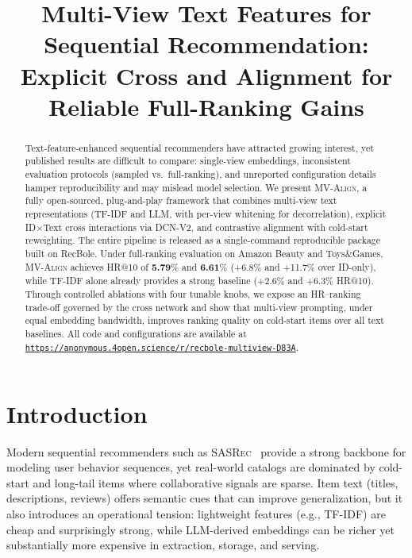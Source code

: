 \documentclass[sigconf,natbib=true,anonymous]{acmart}
\newcommand{\model}{\textsc{MV-Align}\xspace}
\newcommand{\base}{\textsc{SASRec}\xspace}
\newcommand{\tfidf}{\textsc{TF-IDF}\xspace}
\newcommand{\llm}{\textsc{LLM}\xspace}
\begin{document}
\title{Multi-View Text Features for Sequential Recommendation:\\
Explicit Cross and Alignment for Reliable Full-Ranking Gains}


\begin{abstract}
Text-feature-enhanced sequential recommenders have attracted growing interest, yet published results are difficult to compare: single-view embeddings, inconsistent evaluation protocols (sampled vs.\ full-ranking), and unreported configuration details hamper reproducibility and may mislead model selection.
%
We present \model, a fully open-sourced, plug-and-play framework that combines multi-view text representations (\tfidf and \llm, with per-view whitening for decorrelation), explicit ID$\times$Text cross interactions via DCN-V2, and contrastive alignment with cold-start reweighting.
The entire pipeline is released as a single-command reproducible package built on RecBole.
%
Under full-ranking evaluation on Amazon Beauty and Toys\&Games, \model achieves HR@10 of \textbf{5.79}\% and \textbf{6.61}\% (+6.8\% and +11.7\% over ID-only), while \tfidf alone already provides a strong baseline (+2.6\% and +6.3\% HR@10).
Through controlled ablations with four tunable knobs, we expose an HR--ranking trade-off governed by the cross network and show that multi-view prompting, under equal embedding bandwidth, improves ranking quality on cold-start items over all text baselines.
All code and configurations are available at \texttt{\url{https://anonymous.4open.science/r/recbole-multiview-D83A}}.
\end{abstract}


\maketitle

\section{Introduction}

Modern sequential recommenders such as \base~\cite{kang2018sasrec}
provide a strong backbone for modeling user behavior sequences,
yet real-world catalogs are dominated by cold-start and long-tail
items where collaborative signals are sparse. Item text (titles,
descriptions, reviews) offers semantic cues that can improve
generalization, but it also introduces an operational tension:
lightweight features (e.g., \tfidf) are cheap and surprisingly
strong, while \llm-derived embeddings can be richer yet
substantially more expensive in extraction, storage, and serving.
\end{document}
